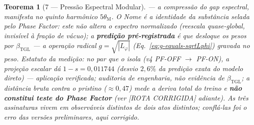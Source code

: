\documentclass[12pt,a4paper]{article}
\newtheorem*{theoremfixed}{Teorema}
\newcommand{\betatgl}{\beta_{\text{TGL}}}
\newcommand{\thetaM}{\theta_{\text{M}}}
\newcommand{\Lphi}{L_{\varphi}}
\begin{document}
\begin{theoremfixed}[7 --- Pressão Espectral Modular]
--- a compressão do gap espectral, manifesta no quinto harmônico $5\thetaM$.  O
\emph{Nome} é a identidade da substância selada pelo \emph{Phase Factor}: este
não altera o espectro \emph{normalizado} (reescala quase-global, invisível à
fração de vácuo); a \textbf{predição pré-registrada} é que desloque os pesos por
$\betatgl$ --- a operação radical $g = \sqrt{|\Lphi|}$
(Eq.~\ref{eq:g-equals-sqrtLphi}) gravada no peso.  Estatuto da medição: no
\emph{par que o isola} (v4 PF-OFF $\to$ PF-ON), a projeção escalar dá
$1-s=0{,}011744$ (desvio $2{,}6\%$ da predição exata do modelo direto) ---
\emph{aplicação verificada; auditoria de engenharia, não evidência de $\betatgl$};
a distância \emph{bruta} contra o pristino ($\approx0{,}47$) mede a deriva total
do treino e \textbf{não constitui teste do \emph{Phase Factor}} (ver
[ROTA CORRIGIDA] adiante).  As três assinaturas vivem em observáveis distintos de
\emph{dois} atos distintos; conflá-las foi o erro das versões preliminares, aqui
corrigido.
\end{theoremfixed}
\end{document}
